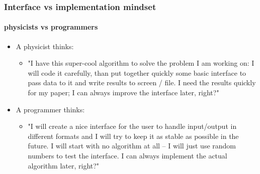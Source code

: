 \documentclass[9pt]{beamer}
\begin{document}
\begin{frame}
  \frametitle{Interface vs implementation mindset}
  \framesubtitle{physicists vs programmers}
  
  \begin{itemize}
    
    \item A physicist thinks:
        
    \medskip
      
    \begin{itemize}
      \item "I have this super-cool algorithm to solve the problem I am working on:
             I will code it carefully, than put together quickly some basic 
             interface to pass data to it and write results to screen / file.
             I need the results quickly for my paper; I can always improve the 
             interface later, right?"
    \end{itemize}
    \medskip
      
    \item A programmer thinks:
    
    \medskip
    
    \begin{itemize}
      \item "I will create a nice interface for the user to handle input/output
             in different formats and I will try to keep it as stable as 
             possible in the future.
             I will start with no algorithm at all -- I will just use random
             numbers to test the interface. I can always implement the
             actual algorithm later, right?"
    \end{itemize}

  \end{itemize}

\end{frame}
 
\end{document}
